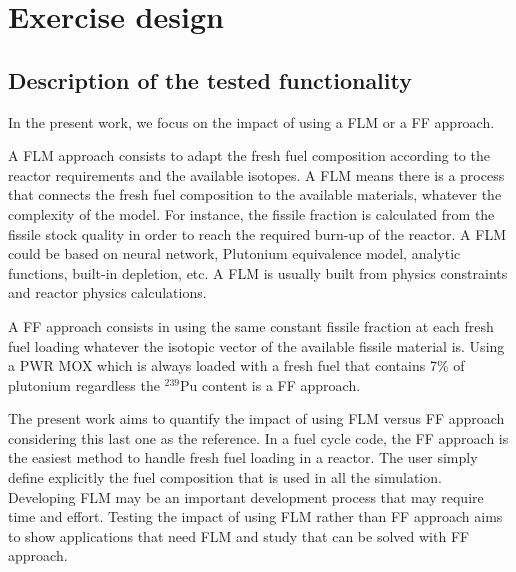 \section{Exercise design}

\subsection{Description of the tested functionality}

In the present work, we focus on the impact of using a \gls{FLM} or a \gls{FF} approach. 

A \gls{FLM} approach consists to adapt the fresh fuel composition according to
the reactor requirements and the available isotopes. A \gls{FLM} means there is a
process that connects the fresh fuel composition to the available materials,
whatever the complexity of the model. For instance, the fissile fraction is
calculated from the fissile stock quality in order to reach the required burn-up
of the reactor. A \gls{FLM} could be based on neural network, Plutonium
equivalence model, analytic functions, built-in depletion, etc. A \gls{FLM} is
usually built from physics constraints and reactor physics calculations. 

A \gls{FF} approach consists in using the same constant fissile
fraction at each fresh fuel loading whatever the isotopic vector of the
available fissile material is. Using a PWR MOX which is always loaded with a
fresh fuel that contains 7\% of plutonium regardless the $^{239}$Pu content is a
\gls{FF} approach. 

The present work aims to quantify the impact of using \gls{FLM} versus \gls{FF}
approach considering this last one as the reference. In a fuel cycle code, the
\gls{FF} approach is the easiest method to handle fresh fuel loading in a reactor. The
user simply define explicitly the fuel composition that is used in all the
simulation. Developing \gls{FLM} may be an important development process that
may require time and effort. Testing the impact of using \gls{FLM} rather than
\gls{FF} approach aims to show applications that need \gls{FLM} and study that can be
solved with \gls{FF} approach.

